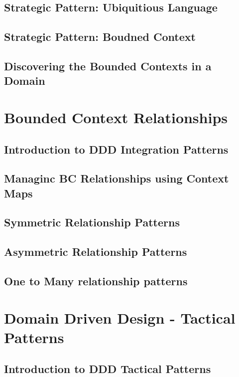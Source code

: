 \documentclass[a4paper, 11pt]{book}
\begin{document}
    \section{Strategic Pattern: Ubiquitious Language}


    \section{Strategic Pattern: Boudned Context}


    \section{Discovering the Bounded Contexts in a Domain}


    \chapter{Bounded Context Relationships}


    \section{Introduction to DDD Integration Patterns}


    \section{Managinc BC Relationships using Context Maps}


    \section{Symmetric Relationship Patterns}


    \section{Asymmetric Relationship Patterns}


    \section{One to Many relationship patterns}


    \chapter{Domain Driven Design - Tactical Patterns}


    \section{Introduction to DDD Tactical Patterns}
\end{document}
